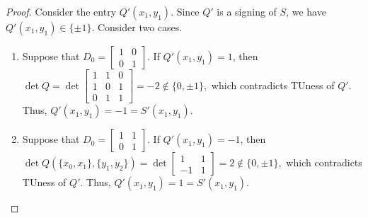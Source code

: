 \begin{proof}
    Consider the entry $Q' (x_{1}, y_{1})$. Since $Q'$ is a signing of $S$, we have $Q' (x_{1}, y_{1}) \in \{\pm 1\}$. Consider two cases.
    \begin{enumerate}
        \item Suppose that $D_{0} = \begin{bmatrix} 1 & 0 \\ 0 & 1 \end{bmatrix}$. If $Q' (x_{1}, y_{1}) = 1$, then
        $
            \det Q = \det \begin{bmatrix}
                1 & 1 & 0 \\
                1 & 0 & 1 \\
                0 & 1 & 1
            \end{bmatrix} = -2 \notin \{0, \pm 1\},
        $
        which contradicts TUness of $Q'$. Thus, $Q' (x_{1}, y_{1}) = -1 = S' (x_{1}, y_{1})$.
        \item Suppose that $D_{0} = \begin{bmatrix} 1 & 1 \\ 0 & 1 \end{bmatrix}$. If $Q' (x_{1}, y_{1}) = -1$, then
        $
            \det Q (\{x_{0}, x_{1}\}, \{y_{1}, y_{2}\}) = \det \begin{bmatrix}
                1 & 1 \\
                -1 & 1
            \end{bmatrix} = 2 \notin \{0, \pm 1\},
        $
        which contradicts TUness of $Q'$. Thus, $Q' (x_{1}, y_{1}) = 1 = S' (x_{1}, y_{1})$.
    \end{enumerate}
\end{proof}

